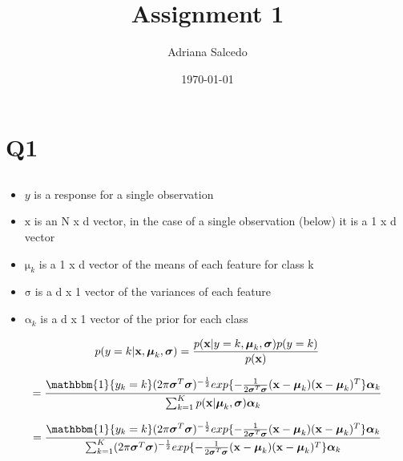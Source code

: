 \documentclass[12pt,letterpaper]{article} %
\title{\Large Assignment 1}
\author{\large Adriana Salcedo}
\date{\large \today}
\newcommand{\bs}[1]{\bm{\mathrm{#1}}} %
\newcommand{\switch}[0]{\mathbbm{1}\{y_k=k\}}
\begin{document}
\maketitle

\section{Q1}

\subsection{}
 \begin{itemize}
 \item $y$ is a response for a single observation
  \item $\bs{x}$ is an N x d vector, in the case of a single observation (below) it is a 1 x d vector
  \item $\bs{\mu}_k$ is a 1 x d vector of the means of each feature for class k 
  \item $\bs{\sigma}$ is a d x 1 vector of the variances of each feature
  \item $\bs{\alpha}_k$ is a d x 1 vector of the prior for each class
 \end{itemize}


\begin{equation*}
 p(y=k | \bs{x},\bs{\mu}_k, \bs{\sigma}) = \frac{p(\bs{x}|y=k,\bs{\mu}_k,\bs{\sigma})p(y=k)}{p(\bs{x})} \\
\end{equation*}
 
\begin{equation*}
 =\frac{ \switch(2\pi\bs{\sigma}^T\bs{\sigma})^{-\frac{1}{2}}exp\{-\frac{1}{2\bs{\sigma}^T\bs{\sigma}}(\bs{x}-\bs{\mu}_k)(\bs{x}-\bs{\mu}_k)^T\}\bs{\alpha}_k}{\sum_{k=1}^K p(\bs{x} | \bs{\mu}_k, \bs{\sigma})\bs{\alpha}_k}
\end{equation*}

\begin{equation*}
 = \frac{ \switch(2\pi\bs{\sigma}^T\bs{\sigma})^{-\frac{1}{2}}exp\{-\frac{1}{2\bs{\sigma}^T\bs{\sigma}}(\bs{x}-\bs{\mu}_k)(\bs{x}-\bs{\mu}_k)^T\}\bs{\alpha}_k}{\sum_{k=1}^K (2\pi\bs{\sigma}^T\bs{\sigma})^{-\frac{1}{2}}exp\{-\frac{1}{2\bs{\sigma}^T\bs{\sigma}}(\bs{x}-\bs{\mu}_k)(\bs{x}-\bs{\mu}_k)^T\}\bs{\alpha}_k}
\end{equation*}

\subsection{}
\end{document}
